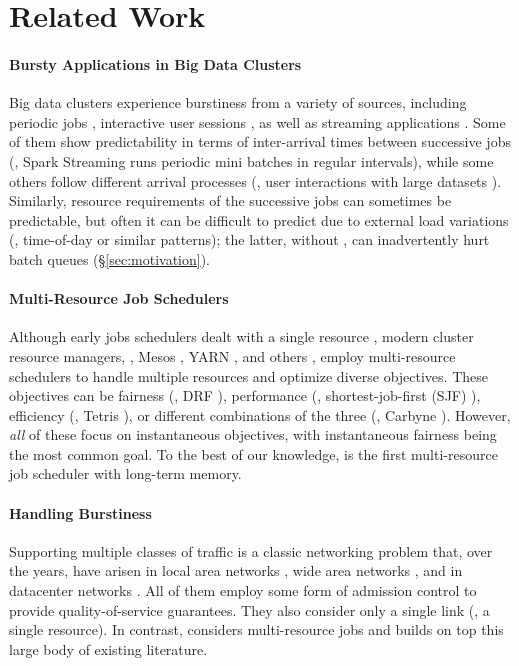 \section{Related Work}
\label{sec:related}

\paragraph{Bursty Applications in Big Data Clusters}
Big data clusters experience burstiness from a variety of sources, including periodic jobs \cite{jockey, rope, scarlett, omega}, interactive user sessions \cite{splunk-analysis}, as well as streaming applications \cite{spark-streaming, millwheel, trident}. 
Some of them show predictability in terms of inter-arrival times between successive jobs (\eg, Spark Streaming \cite{spark-streaming} runs periodic mini batches in regular intervals), while some others follow different arrival processes (\eg, user interactions with large datasets \cite{splunk-analysis}).
Similarly, resource requirements of the successive jobs can sometimes be predictable, but often it can be difficult to predict due to external load variations (\eg, time-of-day or similar patterns); the latter, without {\name}, can inadvertently hurt batch queues (\S\ref{sec:motivation}). 

\paragraph{Multi-Resource Job Schedulers}
Although early jobs schedulers dealt with a single resource \cite{late, mantri, quincy}, modern cluster resource managers, \eg, Mesos \cite{mesos}, YARN \cite{yarn}, and others \cite{omega, borg, cosmos}, employ multi-resource schedulers \cite{drf, sjf, tetris, carbyne, apollo, mercury, hdrf} to handle multiple resources and optimize diverse objectives. 
These objectives can be fairness (\eg, DRF \cite{drf}), performance (\eg, shortest-job-first (SJF) \cite{sjf}), efficiency (\eg, Tetris \cite{tetris}), or different combinations of the three (\eg, Carbyne \cite{carbyne}).
% 
However, \emph{all} of these focus on instantaneous objectives, with instantaneous fairness being the most common goal. 
To the best of our knowledge, {\name} is the first multi-resource job scheduler with long-term memory.

\paragraph{Handling Burstiness}
Supporting multiple classes of traffic is a classic networking problem that, over the years, have arisen in local area networks \cite{cbq, intserv-hierarchy, hfsc, diffserv-rfc2475}, wide area networks \cite{bwe, b4, swan}, and in datacenter networks \cite{silo, qjump}. 
All of them employ some form of admission control to provide quality-of-service guarantees.
They also consider only a single link (\ie, a single resource). 
In contrast, {\name} considers multi-resource jobs and builds on top this large body of existing literature.

